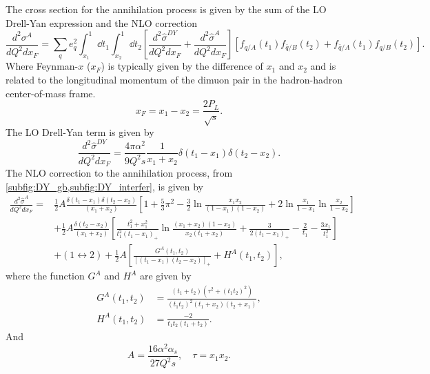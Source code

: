 The cross section for the annihilation process is given by the sum of the LO Drell-Yan expression and
the NLO correction~\cite{kubar1980}
\begin{equation}
	\frac{d^2\sigma^A}{dQ^2dx_{F}} = \sum_q e^2_q \int^1_{x_1} \dd{t_1} \int^1_{x_2} \dd{t_2}
	\left[ \frac{d^2\hat{\sigma}^{DY}}{dQ^2dx_F}+\frac{d^2\hat{\sigma}^{A}}{dQ^2dx_F} \right]
	\left[f_{q/A}\left(t_1\right)f_{\bar{q}/B}\left(t_2\right) +
	f_{\bar{q}/A}\left(t_1\right)f_{q/B}\left(t_2\right)
	\right].
\end{equation}
Where Feynman-$x$ ($x_F$) is typically given by the difference of $x_1$ and $x_2$ and is related to the
longitudinal momentum of the dimuon pair in the hadron-hadron center-of-mass frame.
\begin{equation}
	x_F = x_1 - x_2 = \frac{2P_L}{\sqrt{s}}.
\end{equation}
The LO Drell-Yan term is given by
\begin{equation}
	\frac{ d^2\hat{\sigma}^{DY} }{dQ^2 dx_F} = \frac{4\pi\alpha^2}{9Q^2 s} \frac{1}{x_1+x_2}\delta\left(t_1-x_1\right)\delta\left(t_2-x_2\right).
\end{equation}
The NLO correction to the annihilation process, from \cref{subfig:DY_gb,subfig:DY_interfer},
is given by
\begin{equation}
\begin{split}
	\frac{d^2\hat{\sigma}^{A}}{dQ^2dx_F} =& \frac{1}{2}A \frac{\delta\left(t_1-x_1\right)\delta\left(t_2-x_2\right)}{\left(x_1+x_2\right)} \left[ 1+\frac{5}{3}\pi^2 - \frac{3}{2}\ln\frac{x_1x_2}{\left(1-x_1\right)\left(1-x_2\right)} + 2\ln\frac{x_1}{1-x_1}\ln\frac{x_2}{1-x_2}\right]\\
	&+\frac{1}{2} A \frac{\delta\left(t_2-x_2\right)}{\left(x_1+x_2\right)}\left[\frac{t_1^2+x_1^2}{t_1^2\left(t_1-x_1\right)_{+}} \ln\frac{\left(x_1+x_2\right)\left(1-x_2\right)}{x_2\left(t_1+x_2\right)} + \frac{3}{2\left(t_1-x_1\right)_{+}} -\frac{2}{t_1} - \frac{3x_1}{t_1^2}\right]\\
	&+\left(1\leftrightarrow 2\right) + \frac{1}{2} A \left[\frac{G^A\left(t_1,t_2\right)}{\left[\left(t_1-x_1\right)\left(t_2-x_2\right)\right]_{+}} +H^A\left(t_1,t_2\right)\right],
\end{split}
\end{equation}
where the function $G^A$ and $H^A$ are given by
\begin{align}
	G^A\left(t_1,t_2\right) &= \frac{\left(t_1+t_2\right)\left(\tau^2+\left(t_1t_2\right)^2\right)}{\left(t_1t_2\right)^2\left(t_1+x_2\right)\left(t_2+x_1\right)},\\
	H^A\left(t_1,t_2\right) &= \frac{-2}{t_1t_2\left(t_1+t_2\right)}.
\end{align}
And
\begin{equation}
	A=\frac{16\alpha^2\alpha_s}{27Q^2s}, \quad \tau=x_1x_2.
\end{equation}

